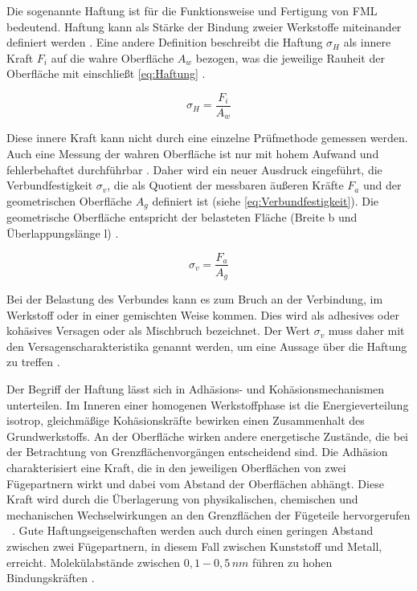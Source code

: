 Die sogenannte Haftung ist für die Funktionsweise und Fertigung von FML bedeutend.
Haftung kann als Stärke der Bindung zweier Werkstoffe miteinander definiert werden \cite{Mann.1994}.
Eine andere Definition beschreibt die Haftung $\sigma_H$ als innere Kraft $F_i$ auf die wahre Oberfläche $A_w$ bezogen, was die jeweilige Rauheit der Oberfläche mit einschließt \autoref{eq:Haftung} \cite{Bischof.1993}.

\begin{equation}
    \sigma_H = \frac{F_i}{A_w}
    \label{eq:Haftung}
\end{equation}

Diese innere Kraft kann nicht durch eine einzelne Prüfmethode gemessen werden.
Auch eine Messung der wahren Oberfläche ist nur mit hohem Aufwand und fehlerbehaftet durchführbar \cite{Brockmann.1969}.
Daher wird ein neuer Ausdruck eingeführt, die Verbundfestigkeit $\sigma_v$, die als Quotient der messbaren äußeren Kräfte $F_a$ und der geometrischen Oberfläche $A_g$ definiert ist (siehe \autoref{eq:Verbundfestigkeit}).
Die geometrische Oberfläche entspricht der belasteten Fläche (Breite b und Überlappungslänge l) \cite{Habenicht.2009}.

\begin{equation}
    \sigma_v = \frac{F_a}{A_g}
    \label{eq:Verbundfestigkeit}
\end{equation}

Bei der Belastung des Verbundes kann es zum Bruch an der Verbindung, im Werkstoff oder in einer gemischten Weise kommen.
Dies wird als adhesives oder kohäsives Versagen oder als Mischbruch bezeichnet.
Der Wert $\sigma_v$ muss daher mit den Versagenscharakteristika genannt werden, um eine Aussage über die Haftung zu treffen \cite{Pan.2016}.

Der Begriff der Haftung lässt sich in Adhäsions- und Kohäsionsmechanismen unterteilen.
Im Inneren einer homogenen Werkstoffphase ist die Energieverteilung isotrop, gleichmäßige Kohäsionskräfte bewirken einen Zusammenhalt des Grundwerkstoffs.
An der Oberfläche wirken andere energetische Zustände, die bei der Betrachtung von Grenzflächenvorgängen entscheidend sind.
Die Adhäsion charakterisiert eine Kraft, die in den jeweiligen Oberflächen von zwei Fügepartnern wirkt und dabei vom Abstand der Oberflächen abhängt.
Diese Kraft wird durch die Überlagerung von physikalischen, chemischen und mechanischen Wechselwirkungen an den Grenzflächen der Fügeteile hervorgerufen \cite{Habenicht.2009}~.
Gute Haftungseigenschaften werden auch durch einen geringen Abstand zwischen zwei Fügepartnern, in diesem Fall zwischen Kunststoff und Metall, erreicht.
Molekülabstände zwischen $0,1 - 0,5\, nm$ führen zu hohen Bindungskräften \cite{Suchentrunk.2007}.

